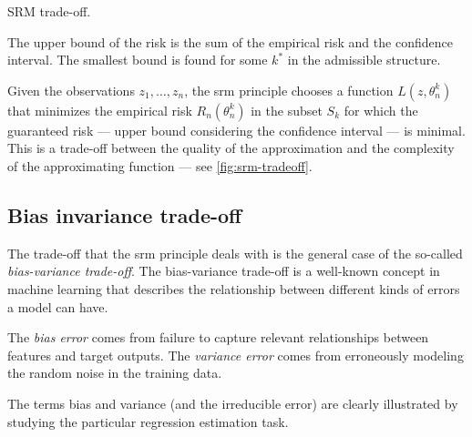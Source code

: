 \begin{figurebox}[label=fig:srm-tradeoff]{SRM trade-off.}
  \centering
  \tcblower
  The upper bound of the risk is the sum of the empirical risk and the confidence
  interval.  The smallest bound is found for some $k^*$ in the admissible structure.
\end{figurebox}

Given the observations $z_1, \dots, z_n$, the \gls{srm} principle chooses a function
$L(z, \theta_n^k)$ that minimizes the empirical risk $R_n(\theta_n^k)$ in the subset
$S_k$ for which the guaranteed risk --- upper bound considering the confidence interval
--- is minimal.  This is a trade-off between the quality of the approximation and the
complexity of the approximating function --- see \cref{fig:srm-tradeoff}.

\subsection{Bias invariance trade-off}

The trade-off that the \gls{srm} principle deals with is the general case of the so-called
\emph{bias-variance trade-off}.  The bias-variance trade-off is a well-known concept in
machine learning that describes the relationship between different kinds of errors a model
can have.

The \emph{bias error} comes from failure to capture relevant relationships between features
and target outputs.  The \emph{variance error} comes from erroneously modeling the random
noise in the training data.

The terms bias and variance (and the irreducible error) are clearly illustrated by
studying the particular regression estimation task.

